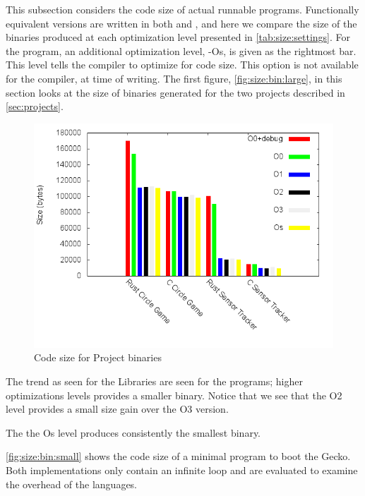 This subsection considers the code size of actual runnable programs.
Functionally equivalent versions are written in both {\rust} and {\C}, and here we compare the size of the binaries produced at each optimization level presented in \autoref{tab:size:settings}.
For the {\C} program, an additional optimization level, -Os, is given as the rightmost bar.
This level tells the compiler to optimize for code size.
This option is not available for the {\rust} compiler, at time of writing.
The first figure, \autoref{fig:size:bin:large}, in this section looks at the size of binaries generated for the two projects described in \autoref{sec:projects}.

\begin{figure}[H]
  \begin{center}
    \includegraphics[scale=0.5]{results/plots/size/bin/large/size.png}
  \end{center}
  \caption{Code size for Project binaries}
  \label{fig:size:bin:large}
\end{figure}

The trend as seen for the Libraries are seen for the {\rust} programs; higher optimizations levels provides a smaller binary.
Notice that we see that the O2 level provides a small size gain over the O3 version.

The the Os {\C} level produces consistently the smallest binary.


\autoref{fig:size:bin:small} shows the code size of a minimal program to boot the Gecko.
Both implementations only contain an infinite loop and are evaluated to examine the overhead of the languages.

